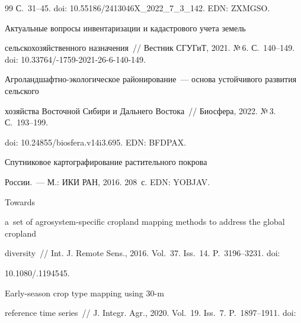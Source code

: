 {{\begin{thebibliography}{99}
С.~31--45. doi: 10.55186\!/\!2413046X\_2022\_7\_3\_142. EDN: ZXMGSO.




 Актуальные вопросы инвентаризации и кадастрового учета земель 

сельскохозяйственного назначения~/\!\!/ Вестник СГУГиТ, 2021. №\,6. С.~140--149. doi: 10.33764\!/-1759-2021-26-6-140-149.





Аг\-ро\-ланд\-шафт\-но-эко\-ло\-ги\-че\-ское районирование~--- основа устойчивого развития сельского 

хозяйства Восточной Сибири и Дальнего Востока~/\!\!/ Биосфера, 2022. №\,3. С.~193--199.

doi: 10.24855\!/\!biosfera.v14i3.695. EDN: BFDPAX.


 Спутниковое картографирование растительного покрова 

России.~--- М.: ИКИ РАН, 2016. 208~с. EDN: YOBJAV.


 Towards 

a~set of agrosystem-specific cropland mapping methods to address the global cropland 

diversity~/\!\!/ Int. J. Remote Sens., 2016. Vol.~37. Iss.~14. P.~3196--3231. doi: 

10.1080\!/.1194545.






 Early-season crop type mapping using 30-m 

reference time series~/\!\!/ J. Integr. Agr., 2020. Vol.~19. Iss.~7. P.~1897--1911. doi: 


\end{thebibliography}}}
